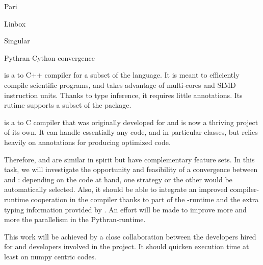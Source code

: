 \begin{Workpackage}{\thewpno}
\begin{WPDescription}
\end{WPDescription}

\begin{task}{Pari}
  \label{task:hpc_pari}

\end{task}

\begin{task}{Linbox}
  \label{task:hpc_linbox}

\end{task}

\begin{task}{Singular}
  \label{task:hpc_singular}

\end{task}


\begin{task}{Pythran-Cython convergence}
  \label{task:pythran_cython}

  \Pythran is a \Python to C++ compiler for a subset of the \Python
  language. It is meant to efficiently compile scientific programs,
  and takes advantage of multi-cores and SIMD instruction units.
  Thanks to type inference, it requires little annotations. Its rutime
  supports a subset of the \Numpy package.

  \Cython is a \Python to C compiler that was originally developed for
  \Sage and is now a thriving project of its own. It can handle
  essentially any \Python code, and in particular classes, but relies
  heavily on annotations for producing optimized code.

  Therefore, \Pythran and \Cython are similar in spirit but have
  complementary feature sets. In this task, we will investigate the
  opportunity and feasibility of a convergence between \Cython and
  \Pythran: depending on the code at hand, one strategy or the other
  would be automatically selected. Also, it should be able to integrate an
  improved compiler-runtime cooperation in the \Cython compiler thanks to
  part of the \Pythran-runtime and the extra typing information provided by
  \Cython. An effort will be made to improve more and more the parallelism in
  the Pythran-runtime.

  This work will be achieved by a close collaboration between the
  \Pythran developers hired for \TheProject and \Cython developers
  involved in the \Sage project. It should quicken \Sage execution time at least
  on numpy centric codes.


\end{task}
\end{Workpackage}
